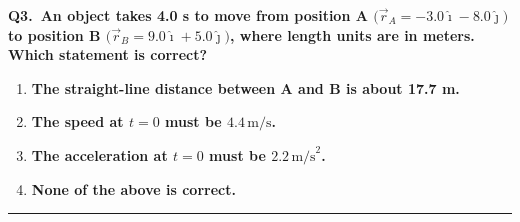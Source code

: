 \documentclass[11pt]{article}
\newcommand{\QuestionStyle}[1]{{\large\bfseries\boldmath #1}}
\newcommand{\AnswerStyle}[1]{{\large\bfseries\boldmath #1}}
\newcommand{\ReasonStyle}[1]{{\normalsize #1}}
\newif\ifshowreason
\newcommand{\Correct}[2]{%
  \item \AnswerStyle{\textcolor{AnsRed}{#1}}%
  \ifshowreason\\[-0.2em]
    \ReasonStyle{\textcolor{AnsRed}{#2}}%
  \fi
}
\newcommand{\Wrong}[2]{%
  \item \AnswerStyle{\textcolor{WrongBlue}{#1}}%
  \ifshowreason\\[-0.2em]
    \ReasonStyle{\textcolor{WrongBlue}{#2}}%
  \fi
}
\newcommand{\QBlock}[3]{%
  \Needspace{8\baselineskip}%
  \noindent
  \begin{minipage}{\linewidth}
    \QuestionStyle{#1.~#2}

    \vspace{0.25em}
    \begin{enumerate}
      #3
    \end{enumerate}

    \vspace{0.25em}
    \hrule height 0.4pt
  \end{minipage}
  \vspace{0.75em}
}
\begin{document}
\QBlock{Q3}{An object takes 4.0 s to move from position A \(\big(\vec r_A=-3.0\hat{\imath}-8.0\hat{\jmath}\big)\) to position B \(\big(\vec r_B=9.0\hat{\imath}+5.0\hat{\jmath}\big)\), where length units are in meters. Which statement is correct?}{
  \Correct{The straight-line distance between A and B is about 17.7 m.}{The displacement is \(\Delta\vec r=\vec r_B-\vec r_A=(9-(-3))\hat{\imath}+(5-(-8))\hat{\jmath}=12\hat{\imath}+13\hat{\jmath}\). Its magnitude is \(|\Delta\vec r|=\sqrt{12^2+13^2}=\sqrt{313}\approx 17.69\,\text{m}\approx 17.7\,\text{m}\).}
  \Wrong{The speed at \(t=0\) must be \(4.4\,\text{m/s}\).}{Dividing displacement magnitude by time gives an average speed (and even that assumes straight-line motion), but the initial speed is not determined by endpoints and total time alone.}
  \Wrong{The acceleration at \(t=0\) must be \(2.2\,\text{m/s}^2\).}{You cannot determine acceleration (or its value at \(t=0\)) uniquely from only initial/final positions and elapsed time without additional constraints (e.g., constant acceleration plus velocity information).}
  \Wrong{None of the above is correct.}{Option A is correct because the straight-line separation is the magnitude of \(\Delta\vec r\), which is \(\sqrt{313}\approx 17.7\,\text{m}\).}
}
\end{document}
